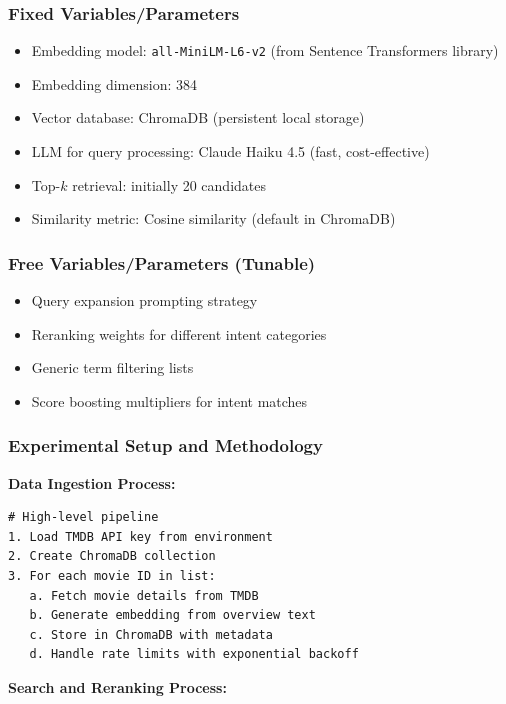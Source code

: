 \documentclass[11pt,a4paper]{article}
\begin{document}
\subsubsection{Fixed Variables/Parameters}

\begin{itemize}
    \item Embedding model: \texttt{all-MiniLM-L6-v2} (from Sentence Transformers library)
    \item Embedding dimension: 384
    \item Vector database: ChromaDB (persistent local storage)
    \item LLM for query processing: Claude Haiku 4.5 (fast, cost-effective)
    \item Top-$k$ retrieval: initially 20 candidates
    \item Similarity metric: Cosine similarity (default in ChromaDB)
\end{itemize}

\subsubsection{Free Variables/Parameters (Tunable)}

\begin{itemize}
    \item Query expansion prompting strategy
    \item Reranking weights for different intent categories
    \item Generic term filtering lists
    \item Score boosting multipliers for intent matches
\end{itemize}

\subsubsection{Experimental Setup and Methodology}

\textbf{Data Ingestion Process:}

\begin{lstlisting}
# High-level pipeline
1. Load TMDB API key from environment
2. Create ChromaDB collection
3. For each movie ID in list:
   a. Fetch movie details from TMDB
   b. Generate embedding from overview text
   c. Store in ChromaDB with metadata
   d. Handle rate limits with exponential backoff
\end{lstlisting}

\textbf{Search and Reranking Process:}
\end{document}
